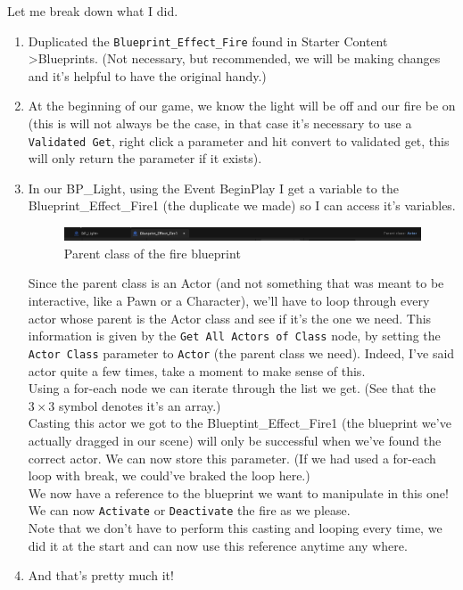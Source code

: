 \documentclass[]{article}
\begin{document}
	Let me break down what I did.
	\begin{enumerate}
		\item Duplicated the \verb*|Blueprint_Effect_Fire| found in Starter Content \textgreater Blueprints. (Not necessary, but recommended, we will be making changes and it's helpful to have the original handy.)
		\item At the beginning of our game, we know the light will be off and our fire be on (this is will not always be the case, in that case it's necessary to use a \verb*|Validated Get|, right click a parameter and hit convert to validated get, this will only return the parameter if it exists).
		\item In our BP\_Light, using the Event BeginPlay I get a variable to the Blueprint\_Effect\_Fire1 (the duplicate we made) so I can access it's variables. 
		\begin{figure}[h]
			\centering
			\includegraphics[width=1\linewidth]{day4images/screenshot018}
			\caption{Parent class of the fire blueprint}
			\label{fig:screenshot018}
		\end{figure}
		Since the parent class is an Actor (and not something that was meant to be interactive, like a Pawn or a Character), we'll have to loop through every actor whose parent is the Actor class and see if it's the one we need. This information is given by the \verb|Get All Actors of Class| node, by setting the \verb|Actor Class| parameter to \verb*|Actor| (the parent class we need). Indeed, I've said actor quite a few times, take a moment to make sense of this.\\[10pt] Using a for-each node we can iterate through the list we get. (See that the $3\times3$ symbol denotes it's an array.)\\[10pt] Casting this actor we got to the Blueptint\_Effect\_Fire1 (the blueprint we've actually dragged in our scene) will only be successful when we've found the correct actor. We can now store this parameter. (If we had used a for-each loop with break, we could've braked the loop here.) \\[10pt] We now have a reference to the blueprint we want to manipulate in this one! We can now \verb*|Activate| or \verb*|Deactivate| the fire as we please.\\[10pt] Note that we don't have to perform this casting and looping every time, we did it at the start and can now use this reference anytime any where.
		\item And that's pretty much it!
	\end{enumerate}
	
\end{document}
